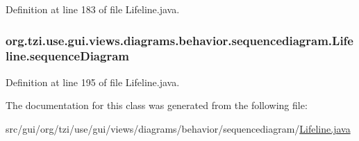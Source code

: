 Definition at line 183 of file Lifeline.\-java.

\hypertarget{classorg_1_1tzi_1_1use_1_1gui_1_1views_1_1diagrams_1_1behavior_1_1sequencediagram_1_1_lifeline_ac6ee70b06590bcc61128a0d044dfe882}{
\subsubsection[{sequence\-Diagram}]{ org.\-tzi.\-use.\-gui.\-views.\-diagrams.\-behavior.\-sequencediagram.\-Lifeline.\-sequence\-Diagram\hspace{0.3cm}{\ttfamily [protected]}}}\label{classorg_1_1tzi_1_1use_1_1gui_1_1views_1_1diagrams_1_1behavior_1_1sequencediagram_1_1_lifeline_ac6ee70b06590bcc61128a0d044dfe882}


Definition at line 195 of file Lifeline.\-java.



The documentation for this class was generated from the following file\-:\begin{DoxyCompactItemize}
\item 
src/gui/org/tzi/use/gui/views/diagrams/behavior/sequencediagram/\hyperlink{_lifeline_8java}{Lifeline.\-java}\end{DoxyCompactItemize}
